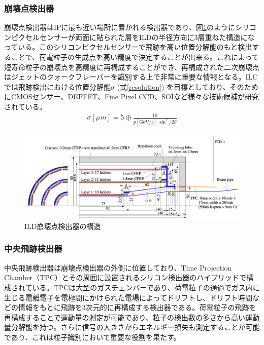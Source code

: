 \subsubsection{崩壊点検出器}
崩壊点検出器はIPに最も近い場所に置かれる検出器であり、図\ref{vertexdetector}のようにシリコンピクセルセンサーが両面に貼られた層をILDの半径方向に3層重ねた構造になっている。このシリコンピクセルセンサーで飛跡を高い位置分解能のもと検出することで、荷電粒子の生成点を高い精度で決定することが出来る。これによって短寿命粒子の崩壊点を高精度に再構成することができ、再構成された二次崩壊点はジェットのクォークフレーバーを識別する上で非常に重要な情報となる。ILCでは飛跡検出における位置分解能$\sigma$ (式\ref{resolution}) を目標としており、そのためにCMOSセンサー、DEPFET、Fine Pixel CCD、SOIなど様々な技術候補が研究されている\cite{tdr2}。
\begin{align}
\label{resolution}
\sigma [\mu m] = 5 \oplus \frac{10} {p[\mathrm{GeV/c}] \ {\sin^3/2{\theta}}}
\end{align}
\begin{figure}[H]
	\begin{center}
 \includegraphics[keepaspectratio, scale=0.3]
 	{Figure/Introduction/vertexdetector.png}
 		\caption {ILD崩壊点検出器の構造}
 		\label{vertexdetector}
	\end{center}
\end{figure}
\subsubsection{中央飛跡検出器}
中央飛跡検出器は崩壊点検出器の外側に位置しており、Time Projection Chamber（TPC）とその周囲に設置されるシリコン検出器のハイブリッドで構成されている。TPCは大型のガスチェンバーであり、荷電粒子の通過でガス内に生じる電離電子を電極間にかけられた電場によってドリフトし、ドリフト時間などの情報をもとに飛跡を3次元的に再構成する検出器である。荷電粒子の飛跡を再構成することで運動量の測定が可能であり、粒子の検出数の多さから高い運動量分解能を持つ。さらに信号の大きさからエネルギー損失も測定することが可能であり、これは粒子識別において重要な役割を果たす。
